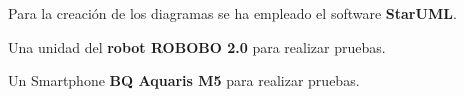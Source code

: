  Para la creación de los diagramas se ha empleado el software \textbf{StarUML}.
 
 
 Una unidad del \textbf{robot ROBOBO 2.0} para realizar pruebas.
 
 Un Smartphone \textbf{BQ Aquaris M5} para realizar pruebas.
 
 
 
  
 
 



